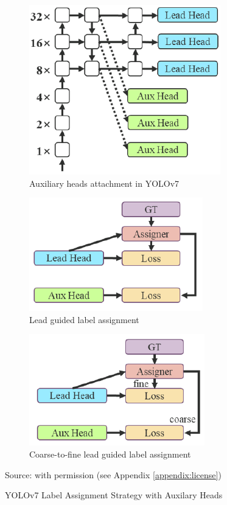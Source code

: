   \begin{figure}[t!]
      \centering

      \begin{subfigure}[][][t]{\textwidth}
        \centering
        \includegraphics[width=.33\linewidth]{figures/auxilary-head.png}
        \caption{Auxiliary heads attachment in YOLOv7}
        \label{fig:aux-head}
      \end{subfigure}

      \begin{subfigure}[][][t]{0.49\textwidth}
        \centering
        \includegraphics[width=.66\linewidth]{figures/lead-head-assigner.png}
        \caption{Lead guided label assignment}
        \label{fig:lead-head}
      \end{subfigure}
      \begin{subfigure}[][][t]{0.49\textwidth}
        \centering
        \includegraphics[width=.66\linewidth]{figures/coarse-to-fine.png}
        \caption{Coarse-to-fine lead guided label assignment}
        \label{fig:coarse-to-fine}
      \end{subfigure}
      \caption*{Source: \textcite{yolov7} with permission (see Appendix \ref{appendix:license})} %
        \vspace{-2ex}
      \caption{YOLOv7 Label Assignment Strategy with Auxilary Heads}
      \label{fig:labelassigner}
  \end{figure}

